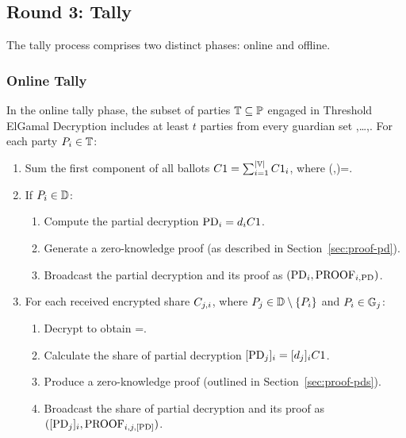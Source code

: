 \documentclass[runningheads]{llncs}
\begin{document}
\subsection{Round 3: Tally}

The tally process comprises two distinct phases: online and offline.

\subsubsection{Online Tally}

In the online tally phase, the subset of parties $\mathbb{T} \subseteq  \mathbb{P}$ engaged in Threshold ElGamal Decryption includes at least $t$ parties from every guardian set ,\dots,\GuardianSetOf{|\SetOfFDKG|}. For each party $P_{i} \in \mathbb{T}$:

\begin{enumerate}
    \item Sum the first component of all ballots $C1 = \sum_{i=1}^{|\mathbb{V}|} C1_{i}$, where (,)=.

    \item If $P_{i} \in \mathbb{D}$:
        \begin{enumerate}
            \item Compute the partial decryption $\mathrm{PD}_{i} = d_{i} C1$.
            \item Generate a zero-knowledge proof  (as described in Section~\ref{sec:proof-pd}).
            \item Broadcast the partial decryption and its proof as $(\mathrm{PD}_{i}, \textrm{PROOF}_{i,\textrm{PD}})$.
        \end{enumerate}
    
    \item For each received encrypted share $C_{j,i}$, where $P_{j} \in \mathbb{D} \setminus \{P_{i}\}$ and $P_{i} \in \mathbb{G}_{j}$:
        \begin{enumerate}
            \item Decrypt to obtain =.
            \item Calculate the share of partial decryption $[\mathrm{PD}_{j}]_{i} = [d_{j}]_{i} C1$.
            \item Produce a zero-knowledge proof  (outlined in Section~\ref{sec:proof-pds}).
            \item Broadcast the share of partial decryption and its proof as $([\mathrm{PD}_{j}]_{i}, \textrm{PROOF}_{i,j,\textrm{[PD]}})$.
        \end{enumerate}
\end{enumerate}
\end{document}

